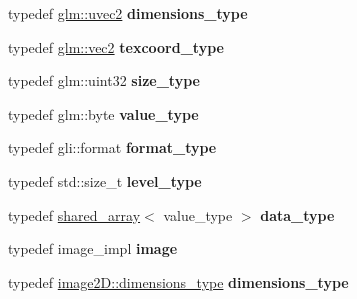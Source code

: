 \begin{DoxyCompactItemize}
\item 
\hypertarget{classgli_1_1texture2D_a3350e964d4498333a5c1a33aa65e1e7a}{typedef \hyperlink{group__core__types_gad0643cb47b927024ccf4979b0e9a903d}{glm\-::uvec2} {\bfseries dimensions\-\_\-type}}\label{classgli_1_1texture2D_a3350e964d4498333a5c1a33aa65e1e7a}

\item 
\hypertarget{classgli_1_1texture2D_a61cbd2160ad7ab3d659c486a2368f247}{typedef \hyperlink{group__core__types_ga66d091b759687504ab01365fbd33a1dd}{glm\-::vec2} {\bfseries texcoord\-\_\-type}}\label{classgli_1_1texture2D_a61cbd2160ad7ab3d659c486a2368f247}

\item 
\hypertarget{classgli_1_1texture2D_a5df0c7f5327f7ddaaf8e0cdf671c9f21}{typedef glm\-::uint32 {\bfseries size\-\_\-type}}\label{classgli_1_1texture2D_a5df0c7f5327f7ddaaf8e0cdf671c9f21}

\item 
\hypertarget{classgli_1_1texture2D_a20659986b0e2147fd10ed261e8f510d3}{typedef glm\-::byte {\bfseries value\-\_\-type}}\label{classgli_1_1texture2D_a20659986b0e2147fd10ed261e8f510d3}

\item 
\hypertarget{classgli_1_1texture2D_ace27f1209f2d048e926c520f778d79d3}{typedef gli\-::format {\bfseries format\-\_\-type}}\label{classgli_1_1texture2D_ace27f1209f2d048e926c520f778d79d3}

\item 
\hypertarget{classgli_1_1texture2D_ab8f232d8cb8cc06be2d871d6050ea3ac}{typedef std\-::size\-\_\-t {\bfseries level\-\_\-type}}\label{classgli_1_1texture2D_ab8f232d8cb8cc06be2d871d6050ea3ac}

\item 
\hypertarget{classgli_1_1texture2D_a292ec289702295f32323ae0a21f76637}{typedef \hyperlink{classgli_1_1shared__array}{shared\-\_\-array}$<$ value\-\_\-type $>$ {\bfseries data\-\_\-type}}\label{classgli_1_1texture2D_a292ec289702295f32323ae0a21f76637}

\item 
\hypertarget{classgli_1_1texture2D_a8191b05f5a3b94115b6da13d05909fda}{typedef image\-\_\-impl {\bfseries image}}\label{classgli_1_1texture2D_a8191b05f5a3b94115b6da13d05909fda}

\item 
\hypertarget{classgli_1_1texture2D_a34c88a91b524f376bb697db381625b95}{typedef \hyperlink{structglm_1_1detail_1_1tvec2}{image2\-D\-::dimensions\-\_\-type} {\bfseries dimensions\-\_\-type}}\label{classgli_1_1texture2D_a34c88a91b524f376bb697db381625b95}


\end{DoxyCompactItemize}
